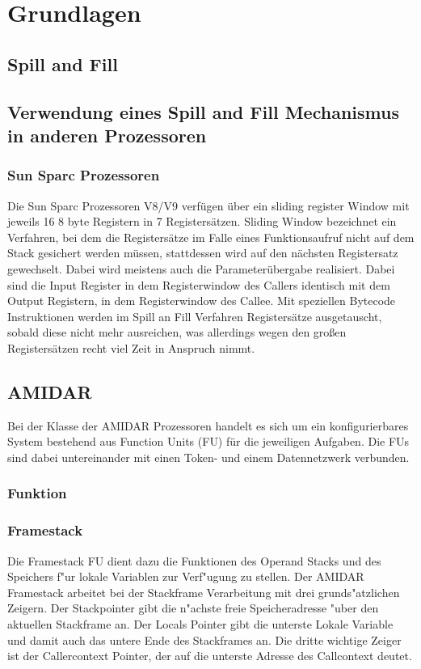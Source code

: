 \chapter{Grundlagen}
\label{cha:Grundlagen}

\section{Spill and Fill}
\section{Verwendung eines Spill and Fill Mechanismus in anderen Prozessoren}
\subsection{Sun Sparc Prozessoren}
Die Sun Sparc Prozessoren V8/V9 verf\"ugen \"uber ein sliding register Window mit jeweils 16 8 byte Registern in 7 Registers\"atzen. Sliding Window bezeichnet ein Verfahren, bei dem die Registers\"atze im Falle eines Funktionsaufruf nicht auf dem Stack gesichert werden m\"ussen, stattdessen wird auf den n\"achsten Registersatz gewechselt. Dabei wird meistens auch die Parameter\"ubergabe realisiert. Dabei sind die Input Register in dem Registerwindow des Callers identisch mit dem Output Registern, in dem Registerwindow des Callee.   
Mit speziellen Bytecode Instruktionen werden im Spill an Fill Verfahren Registers\"atze ausgetauscht, sobald diese nicht mehr ausreichen, was allerdings wegen den großen Registers\"atzen recht viel Zeit in Anspruch nimmt.
\section{AMIDAR}
Bei der Klasse der AMIDAR Prozessoren handelt es sich um ein konfigurierbares System bestehend aus Function Units (FU) für die jeweiligen Aufgaben. Die FUs sind dabei untereinander mit einen Token- und einem Datennetzwerk verbunden. 
\subsection{Funktion}



\subsection{Framestack}

Die Framestack FU dient dazu die Funktionen des Operand Stacks und des Speichers f"ur lokale Variablen zur Verf"ugung zu stellen. 
Der AMIDAR Framestack arbeitet bei der Stackframe Verarbeitung mit drei grunds"atzlichen Zeigern. Der Stackpointer gibt die n"achste freie Speicheradresse "uber den aktuellen Stackframe an. Der Locals Pointer gibt die unterste Lokale Variable und damit auch das untere Ende des Stackframes an. Die dritte wichtige Zeiger ist der Callercontext Pointer, der auf die unterste Adresse des Callcontext deutet. 

